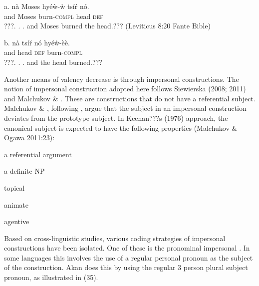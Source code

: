 \documentclass[output=paper]{langsci/langscibook}
\begin{document}
\ea
\gll a.  nà  Moses    hyéẁ-ẁ   tsí\'{r}  nó.\\
       and   Moses     burn-\textsc{compl}  head  \textsc{def}\\
\glt ???. . .  and Moses burned the head.??? (Leviticus 8:20 Fante Bible)
\z

\ea
\gll  b.  nà  tsí\'{r}   nó  hyéẁ-èè.\\
       and  head  \textsc{def}  burn-\textsc{compl}  \\
\glt ???. .  . and the head burned.???
\z


Another means of valency decrease is through impersonal constructions. The notion of impersonal construction adopted here follows Siewierska (2008; 2011) and Malchukov \& \citet{Ogawa2011}. These are constructions that do not have a referential subject. Malchukov \& \citet{Ogawa2011}, following \citet{Keenan1976}, argue that the subject in an impersonal construction deviates from the prototype subject. In Keenan???s (1976) approach, the canonical subject is expected to have the following properties (Malchukov \& Ogawa 2011:23):

\begin{styleNoSpacing}
a referential argument
\end{styleNoSpacing}

\begin{styleNoSpacing}
a definite NP
\end{styleNoSpacing}

\begin{styleNoSpacing}
topical
\end{styleNoSpacing}

\begin{styleNoSpacing}
animate
\end{styleNoSpacing}

\begin{styleNoSpacing}
agentive
\end{styleNoSpacing}

Based on cross-linguistic studies, various coding strategies of impersonal constructions have been isolated. One of these is the pronominal impersonal \citep{Siewierska2011}. In some languages this involves the use of a regular personal pronoun as the subject of the construction. Akan does this by using the regular 3 person plural subject pronoun, as illustrated in (35).
\end{document}
